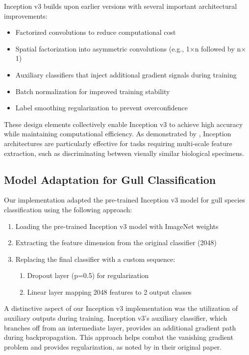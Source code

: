 \documentclass[a4paper,12pt]{article}
\begin{document}
Inception v3 builds upon earlier versions with several important architectural improvements:

\begin{itemize}
    \item Factorized convolutions to reduce computational cost
    \item Spatial factorization into asymmetric convolutions (e.g., 1$\times$n followed by n$\times$1)
    \item Auxiliary classifiers that inject additional gradient signals during training
    \item Batch normalization for improved training stability
    \item Label smoothing regularization to prevent overconfidence
\end{itemize}

These design elements collectively enable Inception v3 to achieve high accuracy while maintaining computational efficiency. As demonstrated by \citep{shu2023multiscale}, Inception architectures are particularly effective for tasks requiring multi-scale feature extraction, such as discriminating between visually similar biological specimens.

\subsection{Model Adaptation for Gull Classification}

Our implementation adapted the pre-trained Inception v3 model for gull species classification using the following approach:

\begin{enumerate}
    \item Loading the pre-trained Inception v3 model with ImageNet weights
    \item Extracting the feature dimension from the original classifier (2048)
    \item Replacing the final classifier with a custom sequence:
    \begin{enumerate}
        \item Dropout layer (p=0.5) for regularization
        \item Linear layer mapping 2048 features to 2 output classes
    \end{enumerate}
\end{enumerate}

A distinctive aspect of our Inception v3 implementation was the utilization of auxiliary outputs during training. Inception v3's auxiliary classifier, which branches off from an intermediate layer, provides an additional gradient path during backpropagation. This approach helps combat the vanishing gradient problem and provides regularization, as noted by \citep{szegedy2016rethinking} in their original paper.
\end{document}
